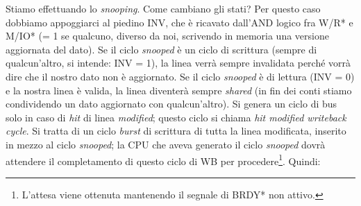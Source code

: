 Stiamo effettuando lo \textit{snooping}. Come cambiano gli stati? Per questo caso dobbiamo appoggiarci al piedino INV, che è ricavato dall'AND logico fra W/R* e M/IO* (= 1 se qualcuno, diverso da noi, scrivendo in memoria una versione aggiornata del dato). Se il ciclo \textit{snooped} è un ciclo di scrittura (sempre di qualcun'altro, si intende: INV = 1), la linea verrà sempre invalidata perché vorrà dire che il nostro dato non è aggiornato. Se il ciclo \textit{snooped} è di lettura (INV = 0) e la nostra linea è valida, la linea diventerà sempre \textit{shared} (in fin dei conti stiamo condividendo un dato aggiornato con qualcun'altro). Si genera un ciclo di bus solo in caso di \textit{hit} di linea \textit{modified}; questo ciclo si chiama \textit{hit modified writeback cycle}. Si tratta di un ciclo \textit{burst} di scrittura di tutta la linea modificata, inserito in mezzo al ciclo \textit{snooped}; la CPU che aveva generato il ciclo \textit{snooped} dovrà attendere il completamento di questo ciclo di WB per procedere\footnote{L'attesa viene ottenuta mantenendo il segnale di BRDY* non attivo.}.
Quindi:
